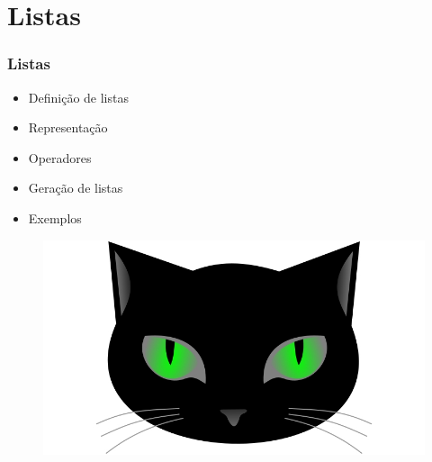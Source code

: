 \section{Listas}


\begin{frame}
\frametitle{Listas}
\begin{minipage}{0.47\textwidth}
    \begin{itemize}
        \item Definição de listas
        \item Representação
        \item Operadores
        \item Geração de listas
        \item Exemplos
    \end{itemize}
\end{minipage}
\begin{minipage}{0.5\textwidth}
\begin{figure}[ht!]
\begin{center}
\includegraphics[width=1.2\textwidth, height=0.40\textheight]{figures/logo_picat_alex.jpg}
\end{center}
\end{figure}
\end{minipage}
\end{frame}



